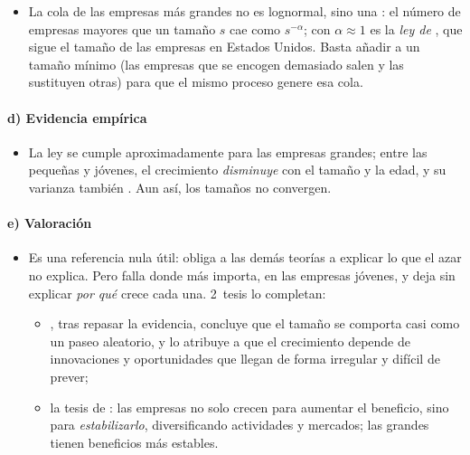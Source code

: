 \documentclass[11pt]{article}
\begin{document}
\begin{itemize}
\item La cola de las empresas más grandes no es lognormal, sino una : el número de empresas mayores que un tamaño $s$ cae como $s^{-\alpha}$; con $\alpha\approx1$ es la \emph{ley de }, que sigue el tamaño de las empresas en Estados Unidos\nocite{Axtell2001Zipf}. Basta añadir a  un tamaño mínimo (las empresas que se encogen demasiado salen y las sustituyen otras) para que el mismo proceso genere esa cola\nocite{Gabaix1999Zipf}.
\end{itemize}

\paragraph{d) Evidencia empírica}

\begin{itemize}
\item La ley se cumple aproximadamente para las empresas grandes; entre las pequeñas y jóvenes, el crecimiento \emph{disminuye} con el tamaño y la edad, y su varianza también\nocite{Evans1987Tests,Hall1987Relationship,Sutton1997Gibrat}  . Aun así, los tamaños no convergen.
\end{itemize}

\paragraph{e) Valoración}

\begin{itemize}
\item Es una referencia nula útil: obliga a las demás teorías a explicar lo que el azar no explica. Pero falla donde más importa, en las empresas jóvenes, y deja sin explicar \emph{por qué} crece cada una. 2~tesis lo completan:
  \begin{itemize}
  \item \textcite{Geroski1999Growth}, tras repasar la evidencia, concluye que el tamaño se comporta casi como un paseo aleatorio, y lo atribuye a que el crecimiento depende de innovaciones y oportunidades que llegan de forma irregular y difícil de prever;
  \item la tesis de : las empresas no solo crecen para aumentar el beneficio, sino para \emph{estabilizarlo}, diversificando actividades y mercados; las grandes tienen beneficios más estables.
  \end{itemize}
\end{itemize}
\end{document}

